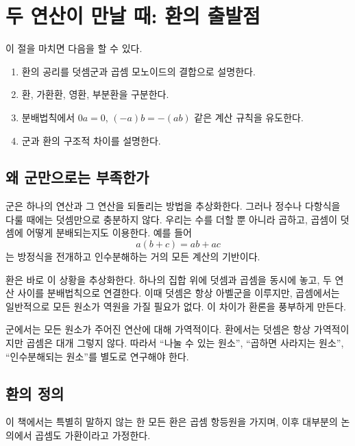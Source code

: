 \section{두 연산이 만날 때: 환의 출발점}
\label{sec:ring-foundations}

\begin{learninggoal}
이 절을 마치면 다음을 할 수 있다.
\begin{enumerate}[label=(\arabic*)]
  \item 환의 공리를 덧셈군과 곱셈 모노이드의 결합으로 설명한다.
  \item 환, 가환환, 영환, 부분환을 구분한다.
  \item 분배법칙에서 $0a=0$, $(-a)b=-(ab)$ 같은 계산 규칙을 유도한다.
  \item 군과 환의 구조적 차이를 설명한다.
\end{enumerate}
\end{learninggoal}

\subsection{왜 군만으로는 부족한가}

군은 하나의 연산과 그 연산을 되돌리는 방법을 추상화한다. 그러나 정수나 다항식을 다룰 때에는 덧셈만으로 충분하지 않다. 우리는 수를 더할 뿐 아니라 곱하고, 곱셈이 덧셈에 어떻게 분배되는지도 이용한다. 예를 들어
\[
  a(b+c)=ab+ac
\]
는 방정식을 전개하고 인수분해하는 거의 모든 계산의 기반이다.

환은 바로 이 상황을 추상화한다. 하나의 집합 위에 덧셈과 곱셈을 동시에 놓고, 두 연산 사이를 분배법칙으로 연결한다. 이때 덧셈은 항상 아벨군을 이루지만, 곱셈에서는 일반적으로 모든 원소가 역원을 가질 필요가 없다. 이 차이가 환론을 풍부하게 만든다.

\begin{keyidea}
군에서는 모든 원소가 주어진 연산에 대해 가역적이다. 환에서는 덧셈은 항상 가역적이지만 곱셈은 대개 그렇지 않다. 따라서 ``나눌 수 있는 원소'', ``곱하면 사라지는 원소'', ``인수분해되는 원소''를 별도로 연구해야 한다.
\end{keyidea}

\subsection{환의 정의}

이 책에서는 특별히 말하지 않는 한 모든 환은 곱셈 항등원을 가지며, 이후 대부분의 논의에서 곱셈도 가환이라고 가정한다.

